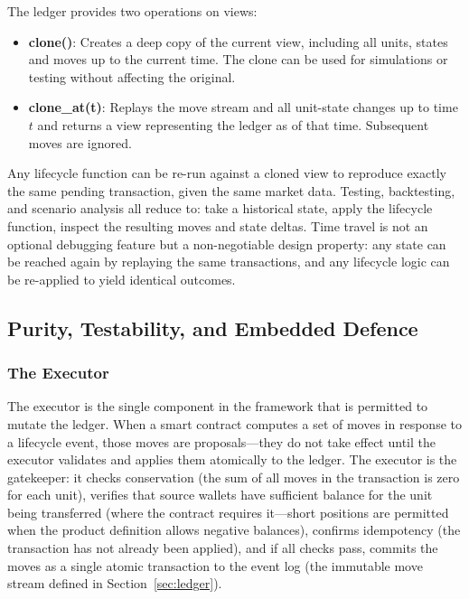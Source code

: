 \documentclass[11pt,a4paper]{article}
\begin{document}
The ledger provides two operations on views:

\begin{itemize}
\item \textbf{clone()}: Creates a deep copy of the current view, including all units, states and moves up to the current time. The clone can be used for simulations or testing without affecting the original.
\item \textbf{clone\_at(t)}: Replays the move stream and all unit-state changes up to time $t$ and returns a view representing the ledger as of that time. Subsequent moves are ignored.
\end{itemize}

Any lifecycle function can be re-run against a cloned view to reproduce exactly the same pending transaction, given the same market data. Testing, backtesting, and scenario analysis all reduce to: take a historical state, apply the lifecycle function, inspect the resulting moves and state deltas. Time travel is not an optional debugging feature but a non-negotiable design property: any state can be reached again by replaying the same transactions, and any lifecycle logic can be re-applied to yield identical outcomes.

\subsection{Purity, Testability, and Embedded Defence}

\subsubsection{The Executor}

The executor is the single component in the framework that is permitted to mutate the ledger. When a smart contract computes a set of moves in response to a lifecycle event, those moves are proposals---they do not take effect until the executor validates and applies them atomically to the ledger. The executor is the gatekeeper: it checks conservation (the sum of all moves in the transaction is zero for each unit), verifies that source wallets have sufficient balance for the unit being transferred (where the contract requires it---short positions are permitted when the product definition allows negative balances), confirms idempotency (the transaction has not already been applied), and if all checks pass, commits the moves as a single atomic transaction to the event log (the immutable move stream defined in Section~\ref{sec:ledger}).
\end{document}
